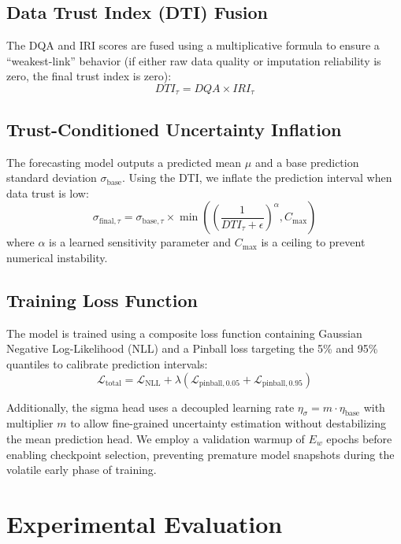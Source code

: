 \documentclass[journal]{IEEEtran}
\begin{document}
\subsection{Data Trust Index (DTI) Fusion}
The DQA and IRI scores are fused using a multiplicative formula to ensure a ``weakest-link'' behavior (if either raw data quality or imputation reliability is zero, the final trust index is zero):
\begin{equation}
DTI_{\tau} = DQA \times IRI_{\tau}
\end{equation}

\subsection{Trust-Conditioned Uncertainty Inflation}
The forecasting model outputs a predicted mean $\mu$ and a base prediction standard deviation $\sigma_{\text{base}}$. Using the DTI, we inflate the prediction interval when data trust is low:
\begin{equation}
\sigma_{\text{final}, \tau} = \sigma_{\text{base}, \tau} \times \min\left( \left(\frac{1}{DTI_{\tau} + \epsilon}\right)^{\alpha}, C_{\max} \right)
\end{equation}
where $\alpha$ is a learned sensitivity parameter and $C_{\max}$ is a ceiling to prevent numerical instability. 

\subsection{Training Loss Function}
The model is trained using a composite loss function containing Gaussian Negative Log-Likelihood (NLL) and a Pinball loss targeting the 5\% and 95\% quantiles to calibrate prediction intervals:
\begin{equation}
\mathcal{L}_{\text{total}} = \mathcal{L}_{\text{NLL}} + \lambda \left( \mathcal{L}_{\text{pinball}, 0.05} + \mathcal{L}_{\text{pinball}, 0.95} \right)
\end{equation}

Additionally, the sigma head uses a decoupled learning rate $\eta_{\sigma} = m \cdot \eta_{\text{base}}$ with multiplier $m$ to allow fine-grained uncertainty estimation without destabilizing the mean prediction head. We employ a validation warmup of $E_w$ epochs before enabling checkpoint selection, preventing premature model snapshots during the volatile early phase of training.

\section{Experimental Evaluation}
\end{document}
